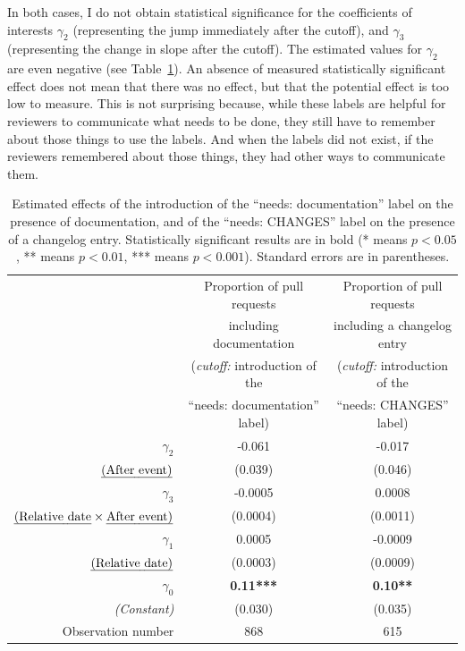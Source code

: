 In both cases, I do not obtain statistical significance for the coefficients of interests $\gamma_2$ (representing the jump immediately after the cutoff), and $\gamma_3$ (representing the change in slope after the cutoff).
The estimated values for $\gamma_2$ are even negative (see Table~\ref{tab:labels}).
An absence of measured statistically significant effect does not mean that there was no effect, but that the potential effect is too low to measure.
This is not surprising because, while these labels are helpful for reviewers to communicate what needs to be done, they still have to remember about those things to use the labels.
And when the labels did not exist, if the reviewers remembered about those things, they had other ways to communicate them.

\begin{table}
	\begin{center}
	\begin{tabular}{|r|c|c|}
		\hline
		& Proportion of pull requests & Proportion of pull requests \\
		& including documentation & including a changelog entry \\
		& (\emph{cutoff:} introduction of the & (\emph{cutoff:} introduction of the \\
		& ``needs: documentation'' label) & ``needs: CHANGES'' label) \\
		\hline
		$\gamma_2$ & -0.061 & -0.017 \\
		$\mbox{\emph{(After event)}}$ & (0.039) & (0.046) \\
		\hline
		$\gamma_3$ & -0.0005 & 0.0008 \\
		$\mbox{\emph{(Relative date}} \times \mbox{\emph{After event)}}$ & (0.0004) & (0.0011) \\
		\hline
		$\gamma_1$ & 0.0005 & -0.0009 \\
		$\mbox{\emph{(Relative date)}}$ & (0.0003) & (0.0009) \\
		\hline
		$\gamma_0$ & \textbf{0.11***} & \textbf{0.10**} \\
		\emph{(Constant)} & (0.030) & (0.035) \\
		\hline
		Observation number & 868 & 615 \\
		\hline
	\end{tabular}
	\caption{
		Estimated effects of the introduction of the ``needs: documentation'' label on the presence of documentation, and of the ``needs: CHANGES'' label on the presence of a changelog entry.
		Statistically significant results are in bold (* means $p < 0.05$, ** means $p < 0.01$, *** means $p < 0.001$).
		Standard errors are in parentheses.
	}
	\label{tab:labels}
\end{center}
\end{table}

